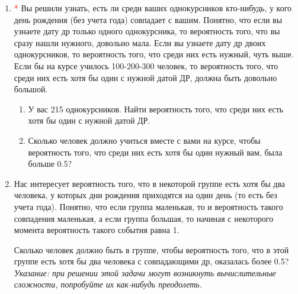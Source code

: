 \documentclass{article}
\begin{document}
\begin{enumerate}
    \item \textcolor{red}{*} Вы решили узнать, есть ли среди ваших однокурсников кто-нибудь, у кого день рождения (без учета года) совпадает с вашим.
    Понятно, что если вы узнаете дату др только одного однокурсника, то вероятность того, что вы сразу нашли нужного, довольно мала. 
    Если вы узнаете дату др двоих однокурсников, то вероятность того, что среди них есть нужный, чуть выше. 
    Если бы на курсе училось 100-200-300 человек, то вероятность того, что среди них есть хотя бы один с нужной датой ДР, должна быть довольно большой.

    \begin{enumerate}
        \item У вас 215 однокурсников. Найти вероятность того, что среди них есть хотя бы один с нужной датой ДР.
        \item Сколько человек должно учиться вместе с вами на курсе, чтобы вероятность того, что среди них есть хотя бы один нужный вам, была больше 0.5?
    \end{enumerate}

    \item Нас интересует вероятность того, что в некоторой группе есть хотя бы два человека, у которых дни рождения приходятся на один день (то есть без учета года). Понятно, что если группа маленькая, то и вероятность такого совпадения маленькая, а если группа большая, то начиная с некоторого момента вероятность такого события равна 1.
    
    Сколько человек должно быть в группе, чтобы вероятность того, что в этой группе есть хотя бы два человека с совпадающими др, оказалась более 0.5?
    \textit{Указание: при решении этой задачи могут возникнуть вычислительные сложности, попробуйте их как-нибудь преодолеть.}
           
\end{enumerate}
\end{document}
